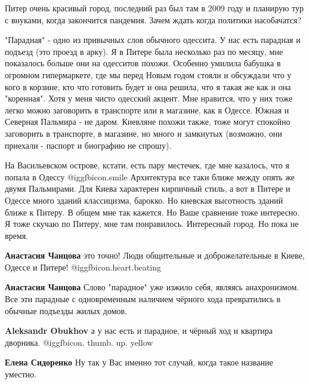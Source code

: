 \begin{itemize}

Питер очень красивый город, последний раз был там в 2009 году и планирую тур с
внуками, когда закончится пандемия. Зачем ждать когда политики насобачатся?


"Парадная" - одно из привычных слов обычного одессита. У нас есть парадная и
подъезд (это проезд в арку). Я в Питере была несколько раз по месяцу, мне
показалось больше они на одесситов похожи. Особенно умилила бабушка в огромном
гипермаркете, где мы перед Новым годом стояли и обсуждали что у кого в корзине,
кто что готовить будет и она решила, что я такая же как и она "коренная". Хотя
у меня чисто одесский акцент. Мне нравится, что у них тоже легко можно
заговорить в транспорте или в магазине, как в Одессе. Южная и Северная Пальмира
- не даром. Киевляне похожи также, тоже могут спокойно заговорить в транспорте,
в магазине, но много и замкнутых (возможно, они приехали - паспорт и биографию
не спрошу). 

На Васильевском острове, кстати, есть пару местечек, где мне казалось, что я
попала в Одессу  @igg{fbicon.smile}  Архитектура все таки ближе между опять же
двумя Пальмирами.  Для Киева характерен кирпичный стиль, а вот в Питере и
Одессе много зданий классицизма, барокко. Но киевская высотность зданий ближе к
Питеру. В общем мне так кажется. Но Ваше сравнение тоже интересно.  Я тоже
скучаю по Питеру, мне там понравилось. Интересный город. Но пока не время.

\begin{itemize} %
\textbf{Анастасия Чанцова} это точно! Люди общительные и доброжелательные в Киеве, Одессе и Питере! @igg{fbicon.heart.beating} 

\textbf{Анастасия Чанцова}
Слово "парадное" уже изжило себя, являясь анахронизмом.
Все эти парадные с одновременным наличием чёрного хода превратились в обычные подъезды жилых домов.

\begin{itemize} %
\textbf{Aleksandr Obukhov} а у нас есть и парадное, и чёрный ход и квартира дворника. @igg{fbicon. thumb. up. yellow} 

\textbf{Елена Сидоренко}
Ну так у Вас именно тот случай, когда такое название уместно.
\end{itemize} %

\end{itemize} %


\end{itemize}
